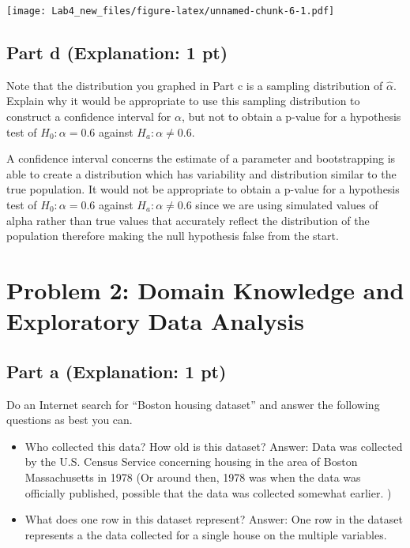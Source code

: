 \documentclass[
]{article}
\providecommand{\tightlist}{%
  \setlength{\itemsep}{0pt}\setlength{\parskip}{0pt}}
\begin{document}
\texttt{[image: Lab4\_new\_files/figure-latex/unnamed-chunk-6-1.pdf]}

\hypertarget{part-d-explanation-1-pt}{%
\subsection{Part d (Explanation: 1 pt)}\label{part-d-explanation-1-pt}}

Note that the distribution you graphed in Part c is a sampling
distribution of \(\hat{\alpha}\). Explain why it would be appropriate to
use this sampling distribution to construct a confidence interval for
\(\alpha\), but not to obtain a p-value for a hypothesis test of
\(H_0: \alpha = 0.6\) against \(H_a: \alpha \neq 0.6\).

A confidence interval concerns the estimate of a parameter and
bootstrapping is able to create a distribution which has variability and
distribution similar to the true population. It would not be appropriate
to obtain a p-value for a hypothesis test of \(H_0: \alpha = 0.6\)
against \(H_a: \alpha \neq 0.6\) since we are using simulated values of
alpha rather than true values that accurately reflect the distribution
of the population therefore making the null hypothesis false from the
start.

\hypertarget{problem-2-domain-knowledge-and-exploratory-data-analysis}{%
\section{Problem 2: Domain Knowledge and Exploratory Data
Analysis}\label{problem-2-domain-knowledge-and-exploratory-data-analysis}}

\hypertarget{part-a-explanation-1-pt}{%
\subsection{Part a (Explanation: 1 pt)}\label{part-a-explanation-1-pt}}

Do an Internet search for ``Boston housing dataset'' and answer the
following questions as best you can.

\begin{itemize}
\tightlist
\item
  Who collected this data? How old is this dataset? Answer: Data was
  collected by the U.S. Census Service concerning housing in the area of
  Boston Massachusetts in 1978 (Or around then, 1978 was when the data
  was officially published, possible that the data was collected
  somewhat earlier. )
\item
  What does one row in this dataset represent? Answer: One row in the
  dataset represents a the data collected for a single house on the
  multiple variables.
\end{itemize}
\end{document}
